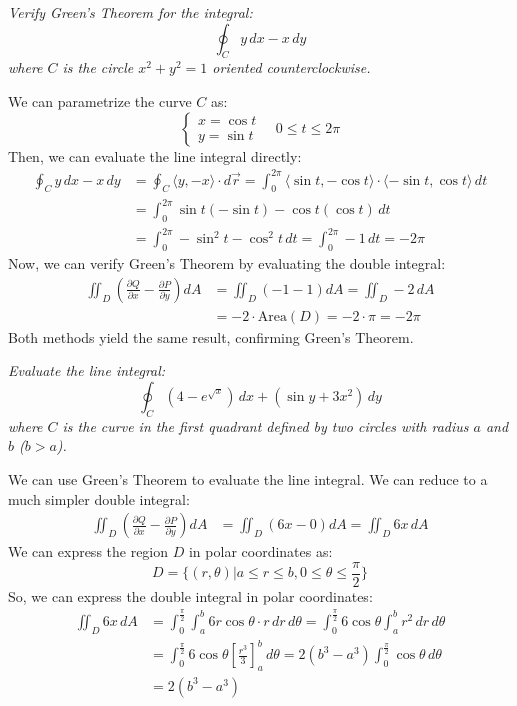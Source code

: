 \documentclass[11pt]{report}
\begin{document}
\begin{example}
    \textit{Verify Green's Theorem for the integral:}
    $$
        \oint_C y \, dx - x \, dy
    $$
    \textit{where \(C\) is the circle \(x^2 + y^2 = 1\) oriented counterclockwise.}

    We can parametrize the curve \(C\) as:
    $$
    \begin{cases}
        x = \cos t \\
        y = \sin t
    \end{cases} \quad 0 \leq t \leq 2\pi
    $$
    Then, we can evaluate the line integral directly:
    \begin{align*}
        \oint_C y \, dx - x \, dy &= \oint_C \langle y, -x \rangle \cdot d\vec{r} = \int_0^{2\pi} \langle \sin t, -\cos t \rangle \cdot \langle -\sin t, \cos t \rangle \, dt \\
        &= \int_0^{2\pi} \sin t (-\sin t) - \cos t (\cos t) \, dt \\
        &= \int_0^{2\pi} -\sin^2 t - \cos^2 t \, dt = \int_0^{2\pi} -1 \, dt = -2\pi
    \end{align*}
    Now, we can verify Green's Theorem by evaluating the double integral:
    \begin{align*}
        \iint_D \left( \frac{\partial Q}{\partial x} - \frac{\partial P}{\partial y} \right) dA &= \iint_D \left( -1 - 1 \right) dA = \iint_D -2 \, dA \\
        &= -2 \cdot \text{Area}(D) = -2 \cdot \pi = -2\pi
    \end{align*}
    Both methods yield the same result, confirming Green's Theorem.
    
\end{example}

\begin{example}
    \textit{Evaluate the line integral:}
    $$
        \oint_C \left(4 - e^{\sqrt{x}}\right) \, dx + \left(\sin{y} + 3x^2\right) \, dy
    $$
    \textit{where \(C\) is the curve in the first quadrant defined by two circles with radius $a$ and $b$ ($b > a$).}

    We can use Green's Theorem to evaluate the line integral. We can reduce to a much simpler double integral:
    \begin{align*}
        \iint_D \left( \frac{\partial Q}{\partial x} - \frac{\partial P}{\partial y} \right) dA &= \iint_D \left( 6x - 0 \right) dA = \iint_D 6x \, dA
    \end{align*}
    We can express the region \(D\) in polar coordinates as:
    $$    D = \{(r, \theta) | a \leq r \leq b, 0 \leq \theta \leq \frac{\pi}{2} \} $$
    So, we can express the double integral in polar coordinates:
    \begin{align*}
        \iint_D 6x \, dA &= \int_0^{\frac{\pi}{2}} \int_a^b 6r \cos \theta \cdot r \, dr \, d\theta = \int_0^{\frac{\pi}{2}} 6\cos \theta \int_a^b r^2 \, dr \, d\theta \\
        &= \int_0^{\frac{\pi}{2}} 6\cos \theta \left[ \frac{r^3}{3} \right]_a^b \, d\theta = 2(b^3 - a^3) \int_0^{\frac{\pi}{2}} \cos \theta \, d\theta \\
        &= 2(b^3 - a^3)
    \end{align*}
\end{example}
\end{document}
